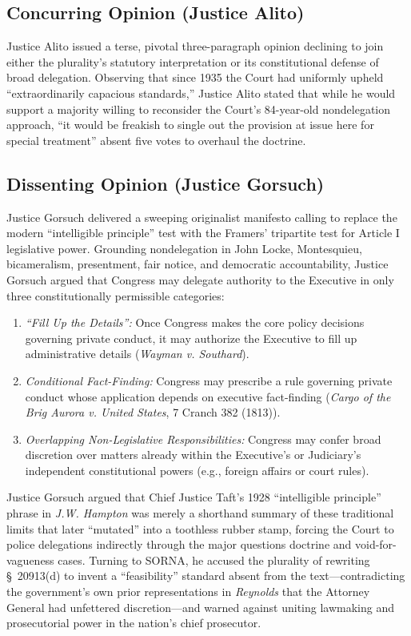 \documentclass[12pt]{article}
\begin{document}
\subsection{Concurring Opinion (Justice Alito)}

Justice Alito issued a terse, pivotal three-paragraph opinion declining to join either the plurality's statutory interpretation or its constitutional defense of broad delegation. Observing that since 1935 the Court had uniformly upheld ``extraordinarily capacious standards,'' Justice Alito stated that while he would support a majority willing to reconsider the Court's 84-year-old nondelegation approach, ``it would be freakish to single out the provision at issue here for special treatment'' absent five votes to overhaul the doctrine.

\subsection{Dissenting Opinion (Justice Gorsuch)}

Justice Gorsuch delivered a sweeping originalist manifesto calling to replace the modern ``intelligible principle'' test with the Framers' tripartite test for Article I legislative power. Grounding nondelegation in John Locke, Montesquieu, bicameralism, presentment, fair notice, and democratic accountability, Justice Gorsuch argued that Congress may delegate authority to the Executive in only three constitutionally permissible categories:
  \begin{enumerate}
    \item \textit{``Fill Up the Details'':} Once Congress makes the core policy decisions governing private conduct, it may authorize the Executive to fill up administrative details (\textit{Wayman v. Southard}).
    \item \textit{Conditional Fact-Finding:} Congress may prescribe a rule governing private conduct whose application depends on executive fact-finding (\textit{Cargo of the Brig Aurora v. United States}, 7 Cranch 382 (1813)).
    \item \textit{Overlapping Non-Legislative Responsibilities:} Congress may confer broad discretion over matters already within the Executive's or Judiciary's independent constitutional powers (e.g., foreign affairs or court rules).
  \end{enumerate}
  Justice Gorsuch argued that Chief Justice Taft's 1928 ``intelligible principle'' phrase in \textit{J.W. Hampton} was merely a shorthand summary of these traditional limits that later ``mutated'' into a toothless rubber stamp, forcing the Court to police delegations indirectly through the major questions doctrine and void-for-vagueness cases. Turning to SORNA, he accused the plurality of rewriting \S~20913(d) to invent a ``feasibility'' standard absent from the text---contradicting the government's own prior representations in \textit{Reynolds} that the Attorney General had unfettered discretion---and warned against uniting lawmaking and prosecutorial power in the nation's chief prosecutor.
\end{document}
